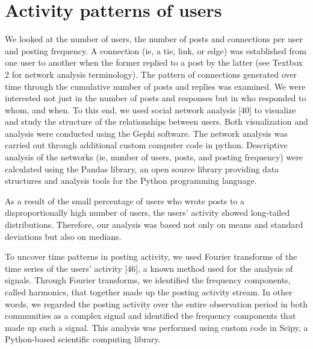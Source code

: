 \section{Activity patterns of users}

We looked at the number of users, the number of posts and connections per user and posting frequency. A connection (ie, a tie, link, or edge) was established from one user to another when the former replied to a post by the latter (see Textbox 2 for network analysis terminology). The pattern of connections generated over time through the cumulative number of posts and replies was examined. We were interested not just in the number of posts and responses but in who responded to whom, and when. To this end, we used social network analysis [40] to visualize and study the structure of the relationships between users. Both visualization and analysis were conducted using the Gephi software. The network analysis was carried out through additional custom computer code in python. Descriptive analysis of the networks (ie, number of users, posts, and posting frequency) were calculated using the Pandas library, an open source library providing data structures and analysis tools for the Python programming language.

As a result of the small percentage of users who wrote posts to a disproportionally high number of users, the users’ activity showed long-tailed distributions. Therefore, our analysis was based not only on means and standard deviations but also on medians.

To uncover time patterns in posting activity, we used Fourier transforms of the time series of the users’ activity [46], a known method used for the analysis of signals. Through Fourier transforms, we identified the frequency components, called harmonics, that together made up the posting activity stream. In other words, we regarded the posting activity over the entire observation period in both communities as a complex signal and identified the frequency components that made up such a signal. This analysis was performed using custom code in Scipy, a Python-based scientific computing library.

